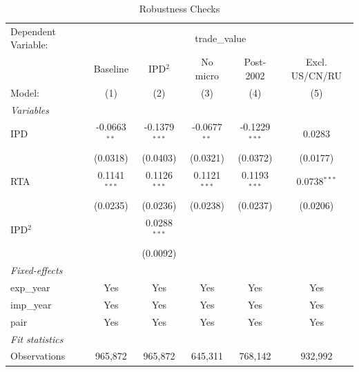 
\begin{table}[htbp]
   \caption{Robustness Checks}
   \centering
   \begin{tabular}{lccccc}
      \tabularnewline \midrule \midrule
      Dependent Variable: & \multicolumn{5}{c}{trade\_value}\\
                          & Baseline              & IPD$^2$               & No micro              & Post-2002             & Excl. US/CN/RU \\   
      Model:              & (1)                   & (2)                   & (3)                   & (4)                   & (5)\\  
      \midrule
      \emph{Variables}\\
      IPD                 & -0.0663$^{**}$        & -0.1379$^{***}$       & -0.0677$^{**}$        & -0.1229$^{***}$       & 0.0283\\   
                          & (0.0318)              & (0.0403)              & (0.0321)              & (0.0372)              & (0.0177)\\   
      RTA                 & 0.1141$^{***}$        & 0.1126$^{***}$        & 0.1121$^{***}$        & 0.1193$^{***}$        & 0.0738$^{***}$\\   
                          & (0.0235)              & (0.0236)              & (0.0238)              & (0.0237)              & (0.0206)\\   
      IPD$^2$             &                       & 0.0288$^{***}$        &                       &                       &   \\   
                          &                       & (0.0092)              &                       &                       &   \\   
      \midrule
      \emph{Fixed-effects}\\
      exp\_year           & Yes                   & Yes                   & Yes                   & Yes                   & Yes\\  
      imp\_year           & Yes                   & Yes                   & Yes                   & Yes                   & Yes\\  
      pair                & Yes                   & Yes                   & Yes                   & Yes                   & Yes\\  
      \midrule
      \emph{Fit statistics}\\
      Observations        & 965,872               & 965,872               & 645,311               & 768,142               & 932,992\\  

\end{tabular}
\end{table}
